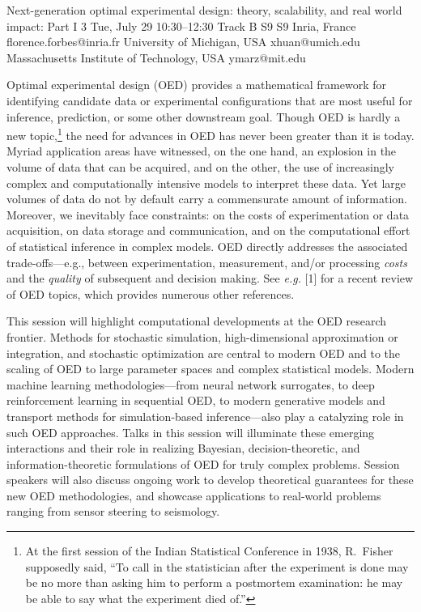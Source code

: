 \begin{talk}
  {Next-generation optimal experimental design: theory, scalability, and real world impact: Part I}%
  {3}%
  {}%
  {}%
  {}%
  {}%
  {Tue, July 29 10:30–12:30 Track B}%
  {S9}%
  {S9}%
  {%
    {Inria, France}%
    {florence.forbes@inria.fr}}%
  {%
	{University of Michigan, USA}%
	{xhuan@umich.edu}}%
  {%
	{Massachusetts Institute of Technology, USA}%
	{ymarz@mit.edu}}%


Optimal experimental design (OED) provides a mathematical framework for identifying candidate data or experimental configurations that are most useful for inference, prediction, or some other downstream goal. Though OED is hardly a new topic,\footnote{At the first session of the Indian Statistical Conference in 1938, R.\ Fisher supposedly said, ``To call in the statistician after the experiment is done may be no more than asking him to perform a postmortem examination: he may be able to say what the experiment died of.''} the need for advances in OED has never been greater than it is today. Myriad application areas have witnessed, on the one hand, an explosion in the volume of data that can be acquired, and on the other, the use of increasingly complex and computationally intensive models to interpret these data. Yet large volumes of data do not by default carry a commensurate amount of information. Moreover, we inevitably face constraints: on the costs of experimentation or data acquisition, on data storage and communication, and on the computational effort of statistical inference in complex models. OED directly addresses the associated trade-offs---e.g., between experimentation, measurement, and/or processing \textit{costs} and 
the \textit{quality} of subsequent and decision making. See {\it e.g.} [1] for a recent review of OED topics, which provides numerous other references.

This session will highlight computational developments at the OED research frontier. Methods for stochastic simulation, high-dimensional approximation or integration, and stochastic optimization are central to modern OED and to the scaling of OED to large parameter spaces and complex statistical models. Modern machine learning methodologies---from neural network surrogates, to deep reinforcement learning in sequential OED, to modern generative models and transport methods for simulation-based inference---also play a catalyzing role in such OED approaches. Talks in this session will illuminate these emerging interactions and their role in realizing Bayesian, decision-theoretic, and information-theoretic formulations of OED for truly complex problems. Session speakers will also discuss ongoing work to develop theoretical guarantees for these new OED methodologies, and showcase applications to real-world problems ranging from sensor steering to seismology.


\end{talk}

